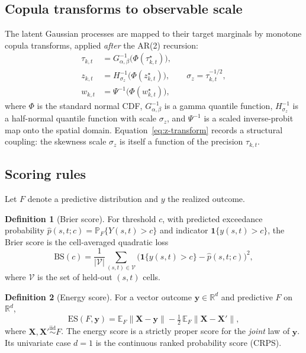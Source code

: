 \documentclass[11pt]{article}
\theoremstyle{definition}
\newtheorem{definition}{Definition}
\theoremstyle{remark}
\newcommand{\R}{\mathbb{R}}
\newcommand{\E}{\mathbb{E}}
\renewcommand{\Pr}{\mathbb{P}}
\newcommand{\indicator}{\mathbf{1}}
\begin{document}
\subsection{Copula transforms to observable scale}

The latent Gaussian processes are mapped to their target marginals by
monotone copula transforms, applied \emph{after} the AR(2) recursion:
\begin{align}
  \tau_{k,t}   &= G^{-1}_{\alpha,\beta}\!\big(\Phi(\tau^\star_{k,t})\big),
  \label{eq:tau-transform}\\
  z_{k,t}      &= H^{-1}_{\sigma_z}\!\big(\Phi(z^\star_{k,t})\big),
  \qquad \sigma_z = \tau_{k,t}^{-1/2},
  \label{eq:z-transform}\\
  w_{k,t}      &= \Psi^{-1}\!\big(\Phi(w^\star_{k,t})\big),
  \label{eq:w-transform}
\end{align}
where $\Phi$ is the standard normal CDF, $G^{-1}_{\alpha,\beta}$ is a
gamma quantile function, $H^{-1}_{\sigma_z}$ is a half-normal quantile
function with scale $\sigma_z$, and $\Psi^{-1}$ is a scaled inverse-probit
map onto the spatial domain. Equation~\eqref{eq:z-transform} records a
structural coupling: the skewness scale $\sigma_z$ is itself a function
of the precision $\tau_{k,t}$.

\subsection{Scoring rules}
\label{sec:scores}

Let $F$ denote a predictive distribution and $y$ the realized outcome.

\begin{definition}[Brier score]
\label{def:brier}
For threshold $c$, with predicted exceedance probability
$\hat p(s,t;c) = \Pr_F\{Y(s,t) > c\}$ and indicator
$\indicator\{y(s,t)>c\}$, the Brier score is the cell-averaged
quadratic loss
\begin{equation}
  \mathrm{BS}(c)
  = \frac{1}{|\mathcal{V}|}
    \sum_{(s,t)\in\mathcal{V}}
    \big(\indicator\{y(s,t)>c\} - \hat p(s,t;c)\big)^2,
  \label{eq:brier}
\end{equation}
where $\mathcal{V}$ is the set of held-out $(s,t)$ cells.
\end{definition}

\begin{definition}[Energy score]
\label{def:energy}
For a vector outcome $\bm y \in \R^d$ and predictive $F$ on $\R^d$,
\begin{equation}
  \mathrm{ES}(F,\bm y)
  = \E_F \|\bm X - \bm y\|
  - \tfrac12\, \E_F \|\bm X - \bm X'\|,
  \label{eq:energy}
\end{equation}
where $\bm X,\bm X' \overset{\text{iid}}{\sim} F$. The energy score is a
strictly proper score for the \emph{joint} law of $\bm y$. Its
univariate case $d=1$ is the continuous ranked probability score
(CRPS).
\end{definition}
\end{document}
